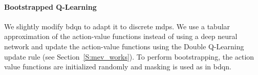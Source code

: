 \paragraph{Bootstrapped Q-Learning} We slightly modify \gls{bdqn} to adapt it to discrete \glspl{mdp}. We use a tabular approximation of the action-value functions instead of using a deep neural network and update the action-value functions using the Double Q-Learning update rule (see Section~\ref{S:mev_works}). To perform bootstrapping, the action value functions are initialized randomly and masking is used as in \gls{bdqn}.

\begin{figure}[t]
\begin{minipage}{.66\textwidth}
\begin{center}
\end{center}
\end{minipage}
\begin{minipage}{.33\textwidth}
\begin{center}

\end{center}
\end{minipage}
\end{figure}
